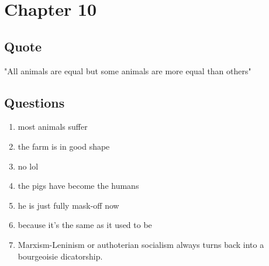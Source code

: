 \documentclass[8pt, letterpaper]{article}
\begin{document}
\section{Chapter 10}

\subsection{Quote}
"All animals are equal but some animals are more equal than others"

\subsection{Questions}
\begin{enumerate}
  \item most animals suffer
  \item the farm is in good shape
  \item no lol
  \item the pigs have become the humans
  \item he is just fully mask-off now
  \item because it's the same as it used to be
  \item Marxism-Leninism or authoterian socialism always turns back into a bourgeoisie dicatorship.
\end{enumerate}

% 
\end{document}
